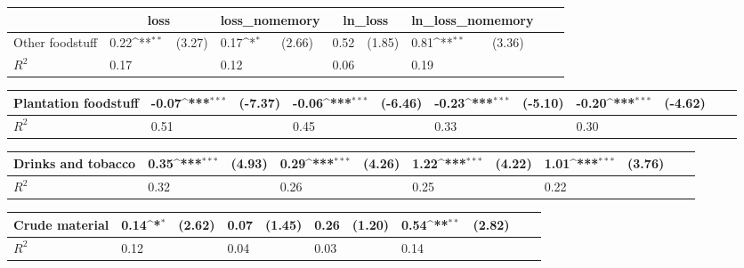 \def\sym#1{\ifmmode^{#1}\else\(^{#1}\)\fi}
\begin{tabular}{p{4cm} p{1.4cm} p{1.2cm} p{1.5cm}  p{1.5cm} p{1.4cm} p{1.2cm} p{1.5cm} p{1.5cm}  p{1.5cm} p{1.5cm} }
                &\multicolumn{2}{c}{loss}    &\multicolumn{2}{c}{loss\_nomemory}&\multicolumn{2}{c}{ln\_loss} &\multicolumn{2}{c}{ln\_loss\_nomemory}\\
\hline
Other foodstuff &     0.22\sym{**} &   (3.27)&     0.17\sym{*}  &   (2.66)&     0.52         &   (1.85)&     0.81\sym{**} &   (3.36)\\
\hline
\(R^{2}\)       &     0.17         &         &     0.12         &         &     0.06         &         &     0.19         &         \\
\end{tabular}
\def\sym#1{\ifmmode^{#1}\else\(^{#1}\)\fi}
\begin{tabular}{p{4cm} p{1.4cm} p{1.2cm} p{1.5cm}  p{1.5cm} p{1.4cm} p{1.2cm} p{1.5cm} p{1.5cm}  p{1.5cm} p{1.5cm} }
\hline
Plantation foodstuff&    -0.07\sym{***}&  (-7.37)&    -0.06\sym{***}&  (-6.46)&    -0.23\sym{***}&  (-5.10)&    -0.20\sym{***}&  (-4.62)\\
\hline
\(R^{2}\)       &     0.51         &         &     0.45         &         &     0.33         &         &     0.30         &         \\
\end{tabular}
\def\sym#1{\ifmmode^{#1}\else\(^{#1}\)\fi}
\begin{tabular}{p{4cm} p{1.4cm} p{1.2cm} p{1.5cm}  p{1.5cm} p{1.4cm} p{1.2cm} p{1.5cm} p{1.5cm}  p{1.5cm} p{1.5cm} }
\hline
Drinks and tobacco&     0.35\sym{***}&   (4.93)&     0.29\sym{***}&   (4.26)&     1.22\sym{***}&   (4.22)&     1.01\sym{***}&   (3.76)\\
\hline
\(R^{2}\)       &     0.32         &         &     0.26         &         &     0.25         &         &     0.22         &         \\
\end{tabular}
\def\sym#1{\ifmmode^{#1}\else\(^{#1}\)\fi}
\begin{tabular}{p{4cm} p{1.4cm} p{1.2cm} p{1.5cm}  p{1.5cm} p{1.4cm} p{1.2cm} p{1.5cm} p{1.5cm}  p{1.5cm} p{1.5cm} }
\hline
Crude material  &     0.14\sym{*}  &   (2.62)&     0.07         &   (1.45)&     0.26         &   (1.20)&     0.54\sym{**} &   (2.82)\\
\hline
\(R^{2}\)       &     0.12         &         &     0.04         &         &     0.03         &         &     0.14         &         \\
\end{tabular}

